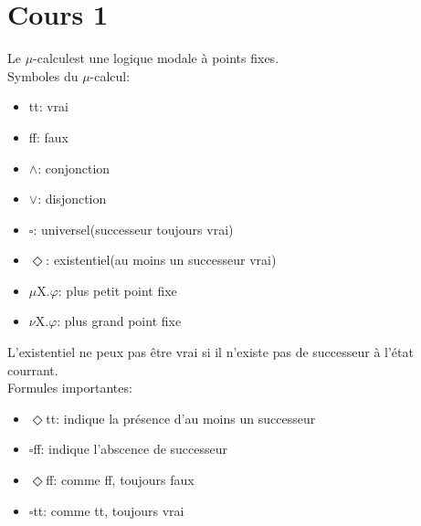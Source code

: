 \section{Cours 1}
Le $\mu$-calculest une logique modale \`a points fixes.\\
Symboles du $\mu$-calcul:
\begin{itemize}
  \item tt: vrai
  \item ff: faux
  \item $\wedge$: conjonction
  \item $\vee$: disjonction
  \item $\square$: universel(successeur toujours vrai)
  \item $\Diamond$: existentiel(au moins un successeur vrai)
  \item $\mu$X.$\varphi$: plus petit point fixe
  \item $\nu$X.$\varphi$: plus grand point fixe
\end{itemize}
L'existentiel ne peux pas \^etre vrai si il n'existe pas de successeur \`a l'\'etat courrant.\\

Formules importantes:
\begin{itemize}
  \item $\Diamond$tt: indique la pr\'esence d'au moins un successeur
  \item $\square$ff: indique l'abscence de successeur
  \item $\Diamond$ff: comme ff, toujours faux
  \item $\square$tt: comme tt, toujours vrai
\end{itemize}

